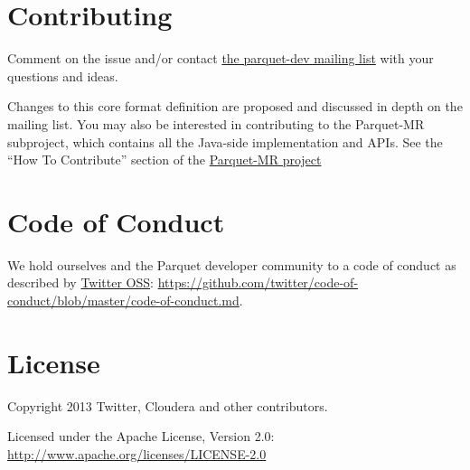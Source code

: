\documentclass[a4paper,12pt,notitlepage,twoside,openright]{article}
\begin{document}
\hypertarget{contributing}{%
\section{Contributing}\label{contributing}}

Comment on the issue and/or contact
\href{http://mail-archives.apache.org/mod_mbox/parquet-dev/}{the
parquet-dev mailing list} with your questions and ideas.

Changes to this core format definition are proposed and discussed in
depth on the mailing list. You may also be interested in contributing to
the Parquet-MR subproject, which contains all the Java-side
implementation and APIs. See the ``How To Contribute'' section of the
\href{https://github.com/apache/parquet-mr\#how-to-contribute}{Parquet-MR
project}

\hypertarget{code-of-conduct}{%
\section{Code of Conduct}\label{code-of-conduct}}

We hold ourselves and the Parquet developer community to a code of
conduct as described by
\href{https://engineering.twitter.com/opensource}{Twitter OSS}:
\url{https://github.com/twitter/code-of-conduct/blob/master/code-of-conduct.md}.

\hypertarget{license}{%
\section{License}\label{license}}

Copyright 2013 Twitter, Cloudera and other contributors.

Licensed under the Apache License, Version 2.0:
\url{http://www.apache.org/licenses/LICENSE-2.0}
\end{document}
